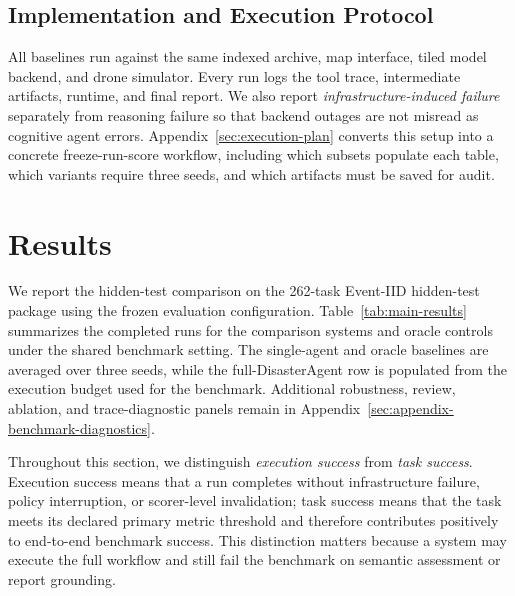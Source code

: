 \documentclass{article}
\begin{document}
\subsection{Implementation and Execution Protocol}

All baselines run against the same indexed archive, map interface, tiled model backend, and drone simulator. Every run logs the tool trace, intermediate artifacts, runtime, and final report. We also report \emph{infrastructure-induced failure} separately from reasoning failure so that backend outages are not misread as cognitive agent errors. Appendix~\ref{sec:execution-plan} converts this setup into a concrete freeze-run-score workflow, including which subsets populate each table, which variants require three seeds, and which artifacts must be saved for audit.

\section{Results}
\label{sec:results}

We report the hidden-test comparison on the 262-task Event-IID hidden-test package using the frozen evaluation configuration. Table~\ref{tab:main-results} summarizes the completed runs for the comparison systems and oracle controls under the shared benchmark setting. The single-agent and oracle baselines are averaged over three seeds, while the full-DisasterAgent row is populated from the execution budget used for the benchmark. Additional robustness, review, ablation, and trace-diagnostic panels remain in Appendix~\ref{sec:appendix-benchmark-diagnostics}.

Throughout this section, we distinguish \emph{execution success} from \emph{task success}. Execution success means that a run completes without infrastructure failure, policy interruption, or scorer-level invalidation; task success means that the task meets its declared primary metric threshold and therefore contributes positively to end-to-end benchmark success. This distinction matters because a system may execute the full workflow and still fail the benchmark on semantic assessment or report grounding.
\end{document}
